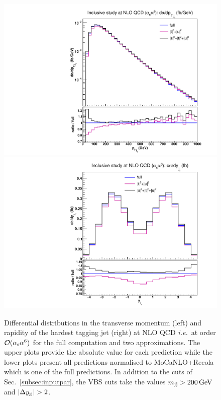 \begin{figure}[hbt]
\centering
{\includegraphics[scale=0.35]{figures/scanfigures/ptj1_nlo.pdf}}
{\includegraphics[scale=0.35]{figures/scanfigures/yj1_nlo.pdf}}
\caption{Differential distributions in the transverse momentum (left) and rapidity of the hardest tagging jet (right) at NLO QCD \emph{i.e.}\ at order $\mathcal{O}(\alpha_\text{s}\alpha^6)$ for the full computation and two approximations.
The upper plots provide the absolute value for each prediction while the lower plots present all predictions normalised to {\sc MoCaNLO}+{\sc Recola} which is one of the full predictions.
In addition to the cuts of Sec.~\ref{subsec:inputpar}, the VBS cuts take the values $m_{\text{j}\text{j}}>200 \,\text{GeV}$ and $|\Delta y_{\Pj\Pj}|>2$.} 
\label{fig:mjjdyjj_1d_2}
\end{figure}


